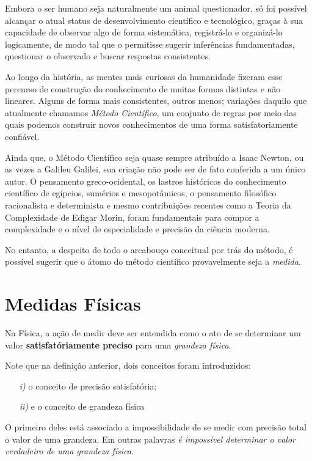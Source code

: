 \documentclass[a4paper, 11pt]{report}
\begin{document}
Embora o ser humano seja naturalmente um animal questionador, só foi possível 
alcançar o atual status de desenvolvimento científico e tecnológico,
graças à sua capacidade de observar algo de forma 
sistemática, registrá-lo e organizá-lo logicamente, de modo tal que o permitisse
sugerir inferências fundamentadas, questionar o observado e 
buscar respostas consistentes. 

Ao longo da história, as mentes mais curiosas da humanidade fizeram esse 
percurso de construção do conhecimento de muitas formas distintas e não 
lineares. Alguns de forma mais consistentes, outros menos; variações daquilo que
atualmente chamamos \emph{Método Científico}, um conjunto de regras por meio
das quais podemos construir novos conhecimentos de uma forma satisfatoriamente 
confiável. 

Ainda que, o Método Científico seja quase sempre atribuído a Isaac Newton, ou as
vezes a Galileu Galilei, sua criação não pode ser de fato conferida a um único 
autor. O pensamento greco-ocidental, os lastros históricos do conhecimento 
científico de egípcios, sumérios e mesopotâmicos, o pensamento filosófico 
racionalista e determinista e mesmo contribuições recentes como a Teoria da 
Complexidade de Edigar Morin, foram fundamentais para compor a complexidade e o
nível de especialidade e precisão da ciência moderna.

No entanto, a despeito de todo o arcabouço conceitual por trás do método, é 
possível sugerir que o átomo do método científico provavelmente seja a 
\emph{medida}. 

\section{Medidas Físicas}
Na Física, a ação de medir deve ser entendida como o ato de se determinar um 
valor \textbf{satisfatóriamente preciso} para uma \emph{grandeza física}.

Note que na definição anterior, dois conceitos foram introduzidos:
\begin{itemize}
    \item[\emph{i)}] o conceito de precisão satisfatória;
    \item[\emph{ii)}] e o conceito de grandeza física
\end{itemize}

O primeiro deles está associado a impossibilidade de se medir com precisão total
o valor de uma grandeza. Em outras palavras \emph{é impossível determinar o 
valor verdadeiro de uma grandeza física.} 
\end{document}
